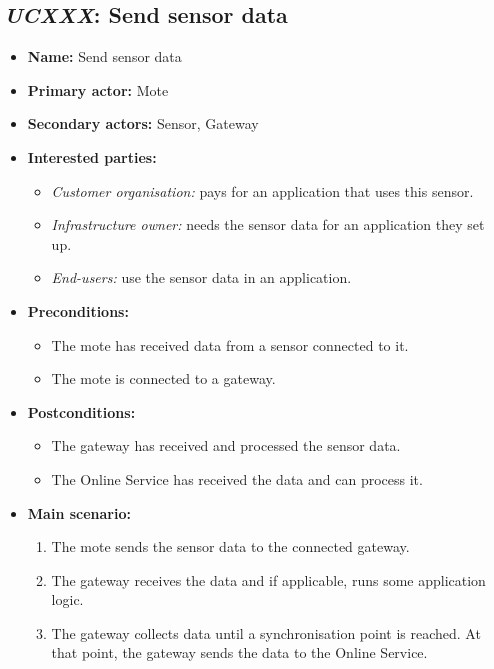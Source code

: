 \subsection{\emph{UCXXX}: Send sensor data}
\begin{itemize}
    \item \textbf{Name:} Send sensor data
    \item \textbf{Primary actor:} Mote
    \item \textbf{Secondary actors:} Sensor, Gateway
    \item \textbf{Interested parties:}
        \begin{itemize}
            \item \textit{Customer organisation:} pays for an application that uses this sensor.
            \item \textit{Infrastructure owner:} needs the sensor data for an application they set up.
            \item \textit{End-users:} use the sensor data in an application.
        \end{itemize}

    \item \textbf{Preconditions:}
        \begin{itemize}
            \item The mote has received data from a sensor connected to it.
            \item The mote is connected to a gateway.
        \end{itemize}

    \item \textbf{Postconditions:}
        \begin{itemize}
            \item The gateway has received and processed the sensor data.
            \item The Online Service has received the data and can process it.
        \end{itemize}

    \item \textbf{Main scenario:}
        \begin{enumerate}
           \item The mote sends the sensor data to the connected gateway.
           \item The gateway receives the data and if applicable, runs some application logic.
           \item The gateway collects data until a synchronisation point is reached.
                 At that point, the gateway sends the data to the Online Service.
        \end{enumerate}


\end{itemize}
